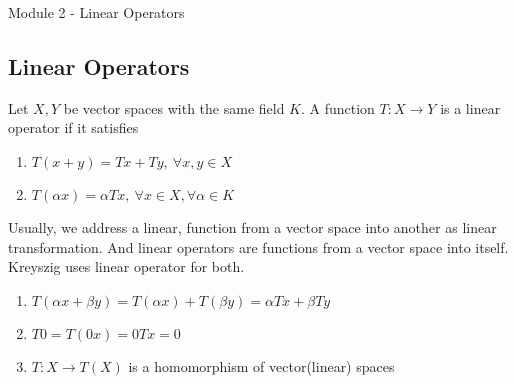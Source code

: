 \pagebreak
{\Large Module 2 - Linear Operators}
\subsection{Linear Operators}%
\begin{definition}
	Let $X,Y$ be vector spaces with the same field $K$.
	A function $T : X \to Y$ is a linear operator if it satisfies
	\begin{enumerate}
		\item $T(x+y) = Tx+Ty,\ \forall x,y \in X$
		\item $T(\alpha x) = \alpha Tx,\ \forall x \in X,\forall \alpha \in K$
	\end{enumerate}
\end{definition}
\begin{commentary}
	Usually, we address a linear, function from a vector space into another as linear transformation.
	And linear operators are functions from a vector space into itself.
	Kreyszig uses linear operator for both.
\end{commentary}
\begin{enumerate}
	\item $T(\alpha x + \beta y) = T(\alpha x) + T(\beta y) = \alpha Tx + \beta Ty$
	\item $T0 = T(0x) = 0Tx = 0$
	\item $T : X \to T(X)$ is a homomorphism of vector(linear) spaces
\end{enumerate}
